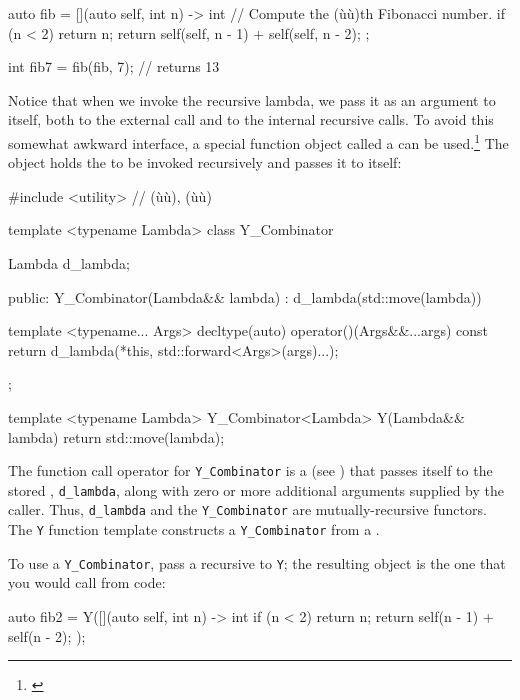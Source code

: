 {\begin{emcppslisting}
auto fib = [](auto self, int n) -> int  // Compute the (ù{}ù)th Fibonacci number.
{
    if (n < 2) { return n; }
    return self(self, n - 1) + self(self, n - 2);
};

int fib7 = fib(fib, 7);  // returns 13
\end{emcppslisting}
    

\noindent Notice that when we invoke the recursive lambda, we pass it as an
argument to itself, both to the external call and to the internal
recursive calls. To avoid this somewhat awkward interface, a special
function object called a  can be
used.{\cprotect\footnote{\cite{hindley86}}} The 
object holds the  to be invoked recursively and
passes it to itself:

\begin{emcppslisting}
#include <utility>  // (ù{}ù), (ù{}ù)

template <typename Lambda>
class Y_Combinator {
    Lambda d_lambda;

public:
    Y_Combinator(Lambda&& lambda) : d_lambda(std::move(lambda)) { }

    template <typename... Args>
    decltype(auto) operator()(Args&&...args) const
    {
        return d_lambda(*this, std::forward<Args>(args)...);
    }
};

template <typename Lambda>
Y_Combinator<Lambda> Y(Lambda&& lambda) { return std::move(lambda); }
\end{emcppslisting}
    

\noindent The function call operator for \lstinline!Y_Combinator! is a
 (see
) that passes itself to the stored
, \lstinline!d_lambda!, along with zero or more
additional arguments supplied by the caller. Thus, \lstinline!d_lambda!
and the \lstinline!Y_Combinator! are mutually-recursive functors. The
\lstinline!Y! function template constructs a \lstinline!Y_Combinator! from a
.

To use a \lstinline!Y_Combinator!, pass a recursive  to \lstinline!Y!; the resulting object is the one that you would
call from code:

\begin{emcppslisting}
auto fib2 = Y([](auto self, int n) -> int
{
    if (n < 2) { return n; }
    return self(n - 1) + self(n - 2);
});


\end{emcppslisting}}
